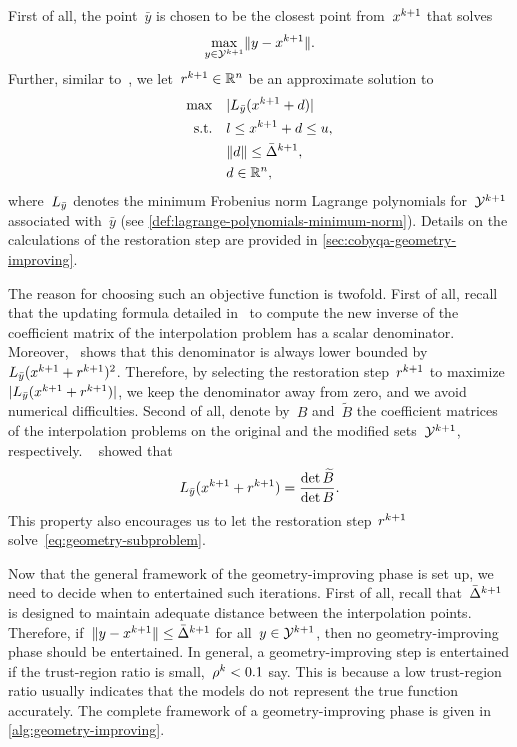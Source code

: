 First of all, the point~$\bar{y}$ is chosen to be the closest point from~$\iter[k + 1]$ that solves
\begin{equation}
    \label{eq:choice-point-geometry-improving}
    \max_{y \in \xpt[k + 1]} \norm{y - \iter[k + 1]}.
\end{equation}
Further, similar to~\cite[Eq.~(6.6)]{Powell_2006}, we let~$\rstep[k + 1] \in \R^n$ be an approximate solution to
\begin{subequations}
    \label{eq:geometry-subproblem}
    \begin{align}
        \max        & \quad \abs{\lagp[\bar{y}](\iter[k + 1] + \step)}\\
        \text{s.t.} & \quad \xl \le \iter[k + 1] + \step \le \xu,\\
                    & \quad \norm{\step} \le \radlb[k + 1],\\
                    & \quad \step \in \R^n,
    \end{align}
\end{subequations}
where~$\lagp[\bar{y}]$ denotes the minimum Frobenius norm Lagrange polynomials for~$\xpt[k + 1]$ associated with~$\bar{y}$ (see \cref{def:lagrange-polynomials-minimum-norm}).
Details on the calculations of the restoration step are provided in \cref{sec:cobyqa-geometry-improving}.

The reason for choosing such an objective function is twofold.
First of all, recall that the updating formula detailed in~\cite[Eq.~(2.12)]{Powell_2004c} to compute the new inverse of the coefficient matrix of the interpolation problem has a scalar denominator.
Moreover,~\cite[Eq.~(6.5)]{Powell_2006} shows that this denominator is always lower bounded by~$\lagp[\bar{y}](\iter[k + 1] + \rstep[k + 1])^2$.
Therefore, by selecting the restoration step~$\rstep[k + 1]$ to maximize~$\abs{\lagp[\bar{y}](\iter[k + 1] + \rstep[k + 1])}$, we keep the denominator away from zero, and we avoid numerical difficulties.
Second of all, denote by~$B$ and~$\widetilde{B}$ the coefficient matrices of the interpolation problems on the original and the modified sets~$\xpt[k + 1]$, respectively.
~\cite[\S~2]{Powell_2001} showed that
\begin{equation*}
    \lagp[\bar{y}](\iter[k + 1] + \rstep[k + 1]) = \frac{\det \widetilde{B}}{\det B}.
\end{equation*}
This property also encourages us to let the restoration step~$\rstep[k + 1]$ solve~\cref{eq:geometry-subproblem}.

Now that the general framework of the geometry-improving phase is set up, we need to decide when to entertained such iterations.
First of all, recall that~$\radlb[k + 1]$ is designed to maintain adequate distance between the interpolation points.
Therefore, if~$\norm{y - \iter[k + 1]} \le \radlb[k + 1]$ for all~$y \in \xpt[k + 1]$, then no geometry-improving phase should be entertained.
In general, a geometry-improving step is entertained if the trust-region ratio is small,~$\ratio[k] < 0.1$ say.
This is because a low trust-region ratio usually indicates that the models do not represent the true function accurately.
The complete framework of a geometry-improving phase is given in \cref{alg:geometry-improving}.

